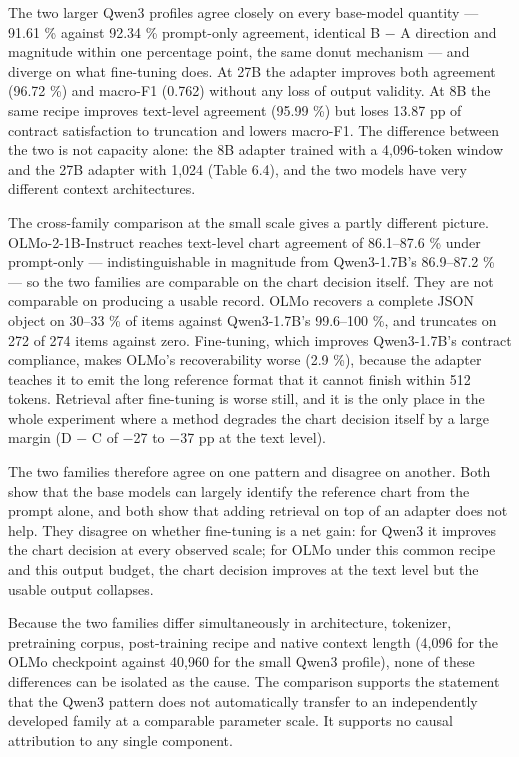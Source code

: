 The two larger Qwen3 profiles agree closely on every base-model quantity --- 91.61 \% against 92.34 \% prompt-only agreement, identical B \ensuremath{-} A direction and magnitude within one percentage point, the same donut mechanism --- and diverge on what fine-tuning does. At 27B the adapter improves both agreement (96.72 \%) and macro-F1 (0.762) without any loss of output validity. At 8B the same recipe improves text-level agreement (95.99 \%) but loses 13.87 pp of contract satisfaction to truncation and lowers macro-F1. The difference between the two is not capacity alone: the 8B adapter trained with a 4,096-token window and the 27B adapter with 1,024 (Table 6.4), and the two models have very different context architectures.

The cross-family comparison at the small scale gives a partly different picture. OLMo-2-1B-Instruct reaches text-level chart agreement of 86.1--87.6 \% under prompt-only --- indistinguishable in magnitude from Qwen3-1.7B's 86.9--87.2 \% --- so the two families are comparable on the chart decision itself. They are not comparable on producing a usable record. OLMo recovers a complete JSON object on 30--33 \% of items against Qwen3-1.7B's 99.6--100 \%, and truncates on 272 of 274 items against zero. Fine-tuning, which improves Qwen3-1.7B's contract compliance, makes OLMo's recoverability worse (2.9 \%), because the adapter teaches it to emit the long reference format that it cannot finish within 512 tokens. Retrieval after fine-tuning is worse still, and it is the only place in the whole experiment where a method degrades the chart decision itself by a large margin (D \ensuremath{-} C of \ensuremath{-}27 to \ensuremath{-}37 pp at the text level).

The two families therefore agree on one pattern and disagree on another. Both show that the base models can largely identify the reference chart from the prompt alone, and both show that adding retrieval on top of an adapter does not help. They disagree on whether fine-tuning is a net gain: for Qwen3 it improves the chart decision at every observed scale; for OLMo under this common recipe and this output budget, the chart decision improves at the text level but the usable output collapses.

Because the two families differ simultaneously in architecture, tokenizer, pretraining corpus, post-training recipe and native context length (4,096 for the OLMo checkpoint against 40,960 for the small Qwen3 profile), none of these differences can be isolated as the cause. The comparison supports the statement that the Qwen3 pattern does not automatically transfer to an independently developed family at a comparable parameter scale. It supports no causal attribution to any single component.

